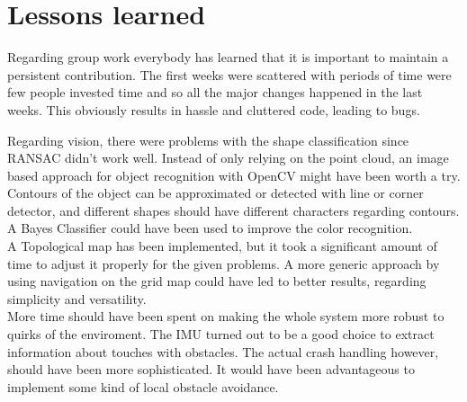\section{Lessons learned}

Regarding group work everybody has learned that it is important to maintain a persistent contribution.
The first weeks were scattered with periods of time were few people invested time and so all the major changes happened in the last weeks.
This obviously results in hassle and cluttered code, leading to bugs.

Regarding vision, there were problems with the shape classification since RANSAC didn't work well. 
Instead of only relying on the point cloud, an image based approach for object recognition with OpenCV might have been worth a try. 
Contours of the object can be approximated or detected with line or corner detector, and different shapes should have different characters regarding contours.
A Bayes Classifier could have been used to improve the color recognition.\\

\setlength{\parindent}{0pt}A Topological map has been implemented, but it took a significant amount of time to adjust it properly for the given problems.
A more generic approach by using navigation on the grid map could have led to better results, regarding simplicity and versatility.\\

\setlength{\parindent}{0pt}More time should have been spent on making the whole system more robust to quirks of the enviroment.
The IMU turned out to be a good choice to extract information about touches with obstacles.
The actual crash handling however, should have been more sophisticated.
It would have been advantageous to implement some kind of local obstacle avoidance.
